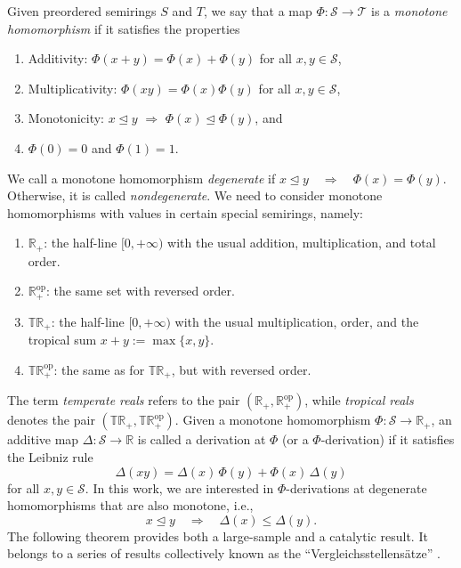 \documentclass[aps,pra,11pt,onecolumn,nofootinbib,tightenlines]{revtex4-2}
\theoremstyle{definition}
\newcommand{\cS}{\mathcal{S}}
\newcommand{\rleq}{\trianglelefteq}
\begin{document}
Given preordered semirings $S$ and $T$, we say that a map $\Phi:\cS\to \mathcal{T}$ is a {\it monotone homomorphism} if it satisfies the properties
\begin{enumerate}
\item Additivity: $\Phi(x+y)=\Phi(x)+\Phi(y)$ for all $x,y\in \cS$,
\item Multiplicativity: $\Phi(xy)=\Phi(x)\Phi(y)$ for all $x,y\in \cS$,
\item Monotonicity: $x\rleq y$ $\Rightarrow$ $\Phi(x)\rleq\Phi(y)$, and
\item $\Phi(0)=0$ and $\Phi(1)=1$.
\end{enumerate}
We call a monotone homomorphism \textit{degenerate} if $ x \rleq y \quad \Rightarrow \quad \Phi(x) = \Phi(y)$. Otherwise, it is called \textit{nondegenerate}.
We need to consider monotone homomorphisms with values in certain special semirings, namely:
\begin{enumerate}
    \item $\mathbb{R}_+$: the half-line $[0,+\infty)$ with the usual addition, multiplication, and total order.
    \item $\mathbb{R}_+^{\mathrm{op}}$: the same set with reversed order. 
    \item $\mathbb{T}\mathbb{R}_+$: the half-line $[0,+\infty)$ with the usual multiplication, order, and the tropical sum $x + y := \max\{x,y\}$.
    \item $\mathbb{T}\mathbb{R}_+^{\mathrm{op}}$: the same as for $\mathbb{T}\mathbb{R}_+$, but with reversed order.
\end{enumerate}
The term \emph{temperate reals} refers to the pair $(\mathbb{R}_+, \mathbb{R}_+^{\mathrm{op}})$, while \emph{tropical reals} denotes the pair $(\mathbb{T}\mathbb{R}_+, \mathbb{T}\mathbb{R}_+^{\mathrm{op}})$.
Given a monotone homomorphism $\Phi: \cS \to \mathbb{R}_+$, an additive map $\Delta: \cS \to \mathbb{R}$ is called a derivation at $\Phi$ (or a $\Phi$-derivation) if it satisfies the Leibniz rule
\begin{equation}
    \Delta(xy) = \Delta(x)\,\Phi(y) + \Phi(x)\,\Delta(y)
\end{equation}
for all $x, y \in \cS$.
In this work, we are interested in $\Phi$-derivations at degenerate homomorphisms that are also monotone, i.e.,
\begin{equation}
    x \rleq y \quad \Rightarrow \quad \Delta(x) \leq \Delta(y).
\end{equation}
The following theorem provides both a large-sample and a catalytic result. It belongs to a series of results collectively known as the ``Vergleichsstellens\"{a}tze'' \cite{fritz2023abstractII}.
\end{document}
